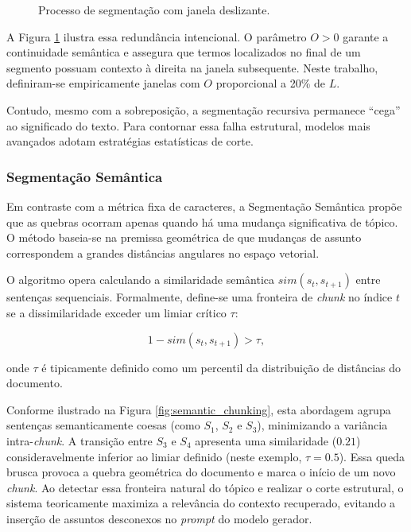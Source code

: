 \begin{figure}[ht]
  \centering
  
  \caption{Processo de segmentação com janela deslizante.}
  \label{fig:chunking_overlap}
\end{figure}

A Figura \ref{fig:chunking_overlap} ilustra essa redundância intencional. O parâmetro $O > 0$ garante a continuidade semântica e assegura que termos localizados no final de um segmento possuam contexto à direita na janela subsequente. Neste trabalho, definiram-se empiricamente janelas com $O$ proporcional a 20\% de $L$.

Contudo, mesmo com a sobreposição, a segmentação recursiva permanece ``cega'' ao significado do texto. Para contornar essa falha estrutural, modelos mais avançados adotam estratégias estatísticas de corte.

\subsubsection{Segmentação Semântica}

Em contraste com a métrica fixa de caracteres, a Segmentação Semântica propõe que as quebras ocorram apenas quando há uma mudança significativa de tópico. O método baseia-se na premissa geométrica de que mudanças de assunto correspondem a grandes distâncias angulares no espaço vetorial.

O algoritmo opera calculando a similaridade semântica $sim(s_t, s_{t+1})$ entre sentenças sequenciais. Formalmente, define-se uma fronteira de \textit{chunk} no índice $t$ se a dissimilaridade exceder um limiar crítico $\tau$:

\begin{equation}
  1 - sim(s_t, s_{t+1}) > \tau,
\end{equation}

onde $\tau$ é tipicamente definido como um percentil da distribuição de distâncias do documento.

Conforme ilustrado na Figura \ref{fig:semantic_chunking}, esta abordagem agrupa sentenças semanticamente coesas (como $S_1$, $S_2$ e $S_3$), minimizando a variância intra-\textit{chunk}. A transição entre $S_3$ e $S_4$ apresenta uma similaridade ($0.21$) consideravelmente inferior ao limiar definido (neste exemplo, $\tau = 0.5$). Essa queda brusca provoca a quebra geométrica do documento e marca o início de um novo \textit{chunk}. Ao detectar essa fronteira natural do tópico e realizar o corte estrutural, o sistema teoricamente maximiza a relevância do contexto recuperado, evitando a inserção de assuntos desconexos no \textit{prompt} do modelo gerador.

